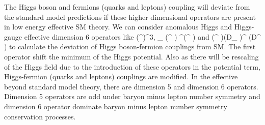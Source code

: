 \documentclass[final,3p]{CSP}
\begin{document}
The Higgs boson and fermions (quarks and leptons) coupling will deviate from the standard model predictions if these higher dimensional 
operators are present in low energy effective SM theory. We can consider anomalous Higgs and Higgs-gauge effective dimension 6 operators 
like (\phi^{\dagger}\phi)^3,  \partial_{\mu} (\phi^{\dagger} \phi) \partial^{\mu}(\phi^{\dagger} \phi) and 
(\phi^{\dagger} \phi)(D_{\mu} \phi)^{\dagger} (D^{\mu} \phi) to calculate the deviation of Higgs boson-fermion couplings from SM. The 
first operator shift the minimum of the Higgs potential. Also as there will be rescaling of the Higgs field due to the introduction of 
these operators in the potential term, Higgs-fermion (quarks and leptons) couplings are modified. In the effective beyond standard model 
theory, there are dimension 5 and dimension 6 operators. Dimension 5 operators are odd under baryon minus lepton number symmetry and 
dimension 6 operator dominate baryon minus lepton number symmetry conservation processes. 
\end{document}
